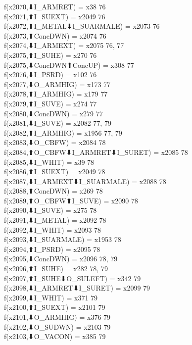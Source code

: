 f(x2070,⬇I_ARMRET) = x38 {76} \\
f(x2071,⬆I_SUEXT) = x2049 {76} \\
f(x2072,⬆I_METAL⬇I_SUARMALE) = x2073 {76} \\
f(x2073,⬆ConcDWN) = x2074 {76} \\
f(x2074,⬇I_ARMEXT) = x2075 {76, 77} \\
f(x2075,⬆I_SUHE) = x270 {76} \\
f(x2075,⬇ConcDWN⬆ConcUP) = x308 {77} \\
f(x2076,⬇I_PSRD) = x102 {76} \\
f(x2077,⬇O_ARMHIG) = x173 {77} \\
f(x2078,⬆I_ARMHIG) = x179 {77} \\
f(x2079,⬆I_SUVE) = x274 {77} \\
f(x2080,⬇ConcDWN) = x279 {77} \\
f(x2081,⬇I_SUVE) = x2082 {77, 79} \\
f(x2082,⬆I_ARMHIG) = x1956 {77, 79} \\
f(x2083,⬇O_CBFW) = x2084 {78} \\
f(x2084,⬆O_CBFW⬇I_ARMRET⬇I_SURET) = x2085 {78} \\
f(x2085,⬇I_WHIT) = x39 {78} \\
f(x2086,⬆I_SUEXT) = x2049 {78} \\
f(x2087,⬇I_ARMEXT⬇I_SUARMALE) = x2088 {78} \\
f(x2088,⬆ConcDWN) = x269 {78} \\
f(x2089,⬆O_CBFW⬆I_SUVE) = x2090 {78} \\
f(x2090,⬇I_SUVE) = x275 {78} \\
f(x2091,⬇I_METAL) = x2092 {78} \\
f(x2092,⬇I_WHIT) = x2093 {78} \\
f(x2093,⬇I_SUARMALE) = x1953 {78} \\
f(x2094,⬆I_PSRD) = x2095 {78} \\
f(x2095,⬇ConcDWN) = x2096 {78, 79} \\
f(x2096,⬆I_SUHE) = x282 {78, 79} \\
f(x2097,⬆I_SUHE⬇O_SULEFT) = x342 {79} \\
f(x2098,⬇I_ARMRET⬇I_SURET) = x2099 {79} \\
f(x2099,⬇I_WHIT) = x371 {79} \\
f(x2100,⬆I_SUEXT) = x2101 {79} \\
f(x2101,⬇O_ARMHIG) = x376 {79} \\
f(x2102,⬇O_SUDWN) = x2103 {79} \\
f(x2103,⬇O_VACON) = x385 {79} \\
